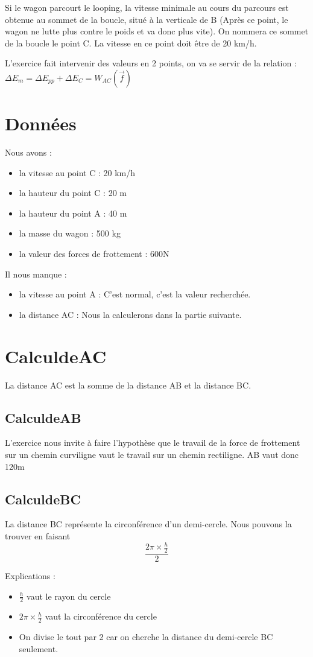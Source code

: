 \documentclass[a4paper,twoside,10pt,french]{scrartcl}
\begin{document}
Si le wagon parcourt le looping, la vitesse minimale
au cours du parcours est obtenue au sommet de
la boucle, situé à la verticale de B (Après ce point, le wagon ne lutte plus contre le poids et va donc plus vite). On nommera ce sommet de la boucle le point C. La vitesse en ce point doit être de 20 km/h.

L'exercice fait intervenir des valeurs en 2 points, on va se servir de la relation : $\Delta E_m = \Delta E_{pp} + \Delta E_C = W_{AC} (\overrightarrow{f})$
\section{Données}
Nous avons :
\begin{itemize}
 \item la vitesse au point C : 20 km/h
 \item la hauteur du point C : 20 m
 \item la hauteur du point A : 40 m
 \item la masse du wagon : 500 kg
 \item la valeur des forces de frottement : 600N
\end{itemize}

Il nous manque :
\begin{itemize}
 \item la vitesse au point A : C'est normal, c'est la valeur recherchée.
 \item la distance AC : Nous la calculerons dans la partie suivante.
\end{itemize}
\section{Calcul\:de\:AC}
La distance AC est la somme de la distance AB et la distance BC.
\subsection{Calcul\:de\:AB}
L'exercice nous invite à faire l'hypothèse que le travail de la force de frottement sur un chemin curviligne vaut le travail sur un chemin rectiligne. AB vaut donc 120m
\subsection{Calcul\:de\:BC}
La distance BC représente la circonférence d'un demi-cercle. Nous pouvons la trouver en faisant $$\frac{2\pi \times \frac{h}{2}}{2}$$

Explications :
\begin{itemize}
 \item $\frac{h}{2}$ vaut le rayon du cercle
 \item $2\pi \times \frac{h}{2}$ vaut la circonférence du cercle
 \item On divise le tout par 2 car on cherche la distance du demi-cercle BC seulement.
\end{itemize}
\end{document}
